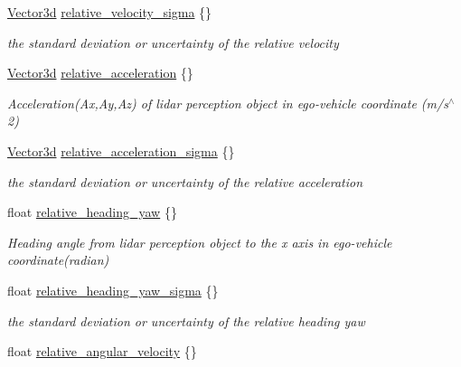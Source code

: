 \begin{DoxyCompactItemize}
\hyperlink{structmaf__perception__interface_1_1Vector3d}{Vector3d} \hyperlink{structmaf__perception__interface_1_1LidarPerceptionObjectData_aec53fe4d54b19bf8c35cc44eccc9dc01}{relative\+\_\+velocity\+\_\+sigma} \{\}
\begin{DoxyCompactList}\small\item\em the standard deviation or uncertainty of the relative velocity \end{DoxyCompactList}\item 
\hyperlink{structmaf__perception__interface_1_1Vector3d}{Vector3d} \hyperlink{structmaf__perception__interface_1_1LidarPerceptionObjectData_ab2d6bef6152245942f5beafcf887b553}{relative\+\_\+acceleration} \{\}
\begin{DoxyCompactList}\small\item\em Acceleration(\+Ax,\+Ay,\+Az) of lidar perception object in ego-\/vehicle coordinate (m/s$^\wedge$2) \end{DoxyCompactList}\item 
\hyperlink{structmaf__perception__interface_1_1Vector3d}{Vector3d} \hyperlink{structmaf__perception__interface_1_1LidarPerceptionObjectData_ae9fe80197c88bc4435fd4d2cc5959f02}{relative\+\_\+acceleration\+\_\+sigma} \{\}
\begin{DoxyCompactList}\small\item\em the standard deviation or uncertainty of the relative acceleration \end{DoxyCompactList}\item 
float \hyperlink{structmaf__perception__interface_1_1LidarPerceptionObjectData_aebe0fa46c2cfd9724d9aadd3803538f3}{relative\+\_\+heading\+\_\+yaw} \{\}
\begin{DoxyCompactList}\small\item\em Heading angle from lidar perception object to the x axis in ego-\/vehicle coordinate(radian) \end{DoxyCompactList}\item 
float \hyperlink{structmaf__perception__interface_1_1LidarPerceptionObjectData_aea72d2ba6468f2df27dad2d943375a27}{relative\+\_\+heading\+\_\+yaw\+\_\+sigma} \{\}
\begin{DoxyCompactList}\small\item\em the standard deviation or uncertainty of the relative heading yaw \end{DoxyCompactList}\item 
float \hyperlink{structmaf__perception__interface_1_1LidarPerceptionObjectData_a424e7e5180fb6b8cd4efc4e950737ed1}{relative\+\_\+angular\+\_\+velocity} \{\}

\end{DoxyCompactItemize}
